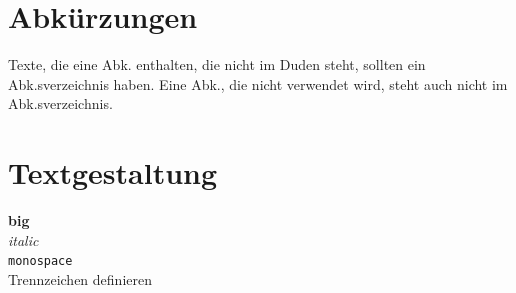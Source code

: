\section{Abkürzungen} \label{hdl:konstrukte_abkuerzungen}
Texte, die eine \acs{Abk.} enthalten, die nicht im Duden steht, sollten ein \acl{Abk.}sverzeichnis haben. Eine \ac{Abk.}, die nicht verwendet wird, steht auch nicht im \acl{Abk.}sverzeichnis.
\clearpage

\section{Textgestaltung} \label{hdl:konstrukte_textgestaltung}
\textbf{big}\\
\textit{\glqq italic\grqq}\\
\texttt{monospace}\\
Trenn\-zeichen definieren\\
\clearpage

